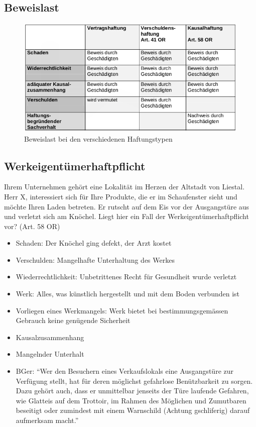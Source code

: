 \subsection{Beweislast}

\begin{figure}[H]
	\centering
	\includegraphics[width=.8\textwidth]{figures/Voraussetzungen_Haftpflichtrecht.png}
	\caption{Beweislast bei den verschiedenen Haftungstypen}
\end{figure}



\subsection{Werkeigentümerhaftpflicht}

Ihrem Unternehmen gehört eine Lokalität im Herzen der Altstadt von
Liestal. Herr X, interessiert sich für Ihre Produkte, die er im
Schaufenster sieht und möchte Ihren Laden betreten. Er rutscht auf dem
Eis vor der Ausgangstüre aus und verletzt sich am Knöchel. Liegt hier
ein Fall der Werkeigentümerhaftpflicht vor? (Art. 58 OR)

\begin{itemize}
	\tightlist
	\item Schaden: Der Knöchel ging defekt, der Arzt kostet
	\item Verschulden: Mangelhafte Unterhaltung des Werkes
	\item Wiederrechtlichkeit: Unbetrittenes Recht für Gesundheit wurde
	verletzt
	\item Werk: Alles, was künstlich hergestellt und mit dem Boden verbunden ist
	\item Vorliegen eines Werkmangels: Werk bietet bei bestimmungsgemässen
	Gebrauch keine genügende Sicherheit
	\item Kausalzusammenhang
	\item Mangelnder Unterhalt
	\item BGer: ``Wer den Besuchern eines Verkaufslokals eine Ausgangstüre zur
	Verfügung stellt, hat für deren möglichst gefahrlose Benützbarkeit zu
	sorgen. Dazu gehört auch, dass er unmittelbar jenseits der Türe
	laufende Gefahren, wie Glatteis auf dem Trottoir, im Rahmen des
	Möglichen und Zumutbaren beseitigt oder zumindest mit einem Warnschild
	(Achtung gschliferig) darauf aufmerksam macht.''
\end{itemize}

